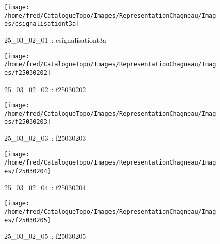 \documentclass[12pt,titlepage]{book}
\begin{document}
\begin{figure}[h!]
  \hfill         %
  \begin{minipage}[t]{3cm}
    \begin{center}
      \texttt{[image: /home/fred/CatalogueTopo/Images/RepresentationChagneau/Images/csignalisationt3a]}
      \caption[~25\_03\_02\_01]{\small{25\_03\_02\_01~:} \tiny{csignalisationt3a}}\label{csignalisationt3a}
    \end{center}
  \end{minipage}
  \begin{minipage}[t]{3cm}
    \begin{center}
      \texttt{[image: /home/fred/CatalogueTopo/Images/RepresentationChagneau/Images/f25030202]}
      \caption[~25\_03\_02\_02]{\small{25\_03\_02\_02~:} \tiny{f25030202}}\label{f25030202}
    \end{center}
  \end{minipage}
  \begin{minipage}[t]{3cm}
    \begin{center}
      \texttt{[image: /home/fred/CatalogueTopo/Images/RepresentationChagneau/Images/f25030203]}
      \caption[~25\_03\_02\_03]{\small{25\_03\_02\_03~:} \tiny{f25030203}}\label{f25030203}
    \end{center}
  \end{minipage}
  \begin{minipage}[t]{3cm}
    \begin{center}
      \texttt{[image: /home/fred/CatalogueTopo/Images/RepresentationChagneau/Images/f25030204]}
      \caption[~25\_03\_02\_04]{\small{25\_03\_02\_04~:} \tiny{f25030204}}\label{f25030204}
    \end{center}
  \end{minipage}
  \begin{minipage}[t]{3cm}
    \begin{center}
      \texttt{[image: /home/fred/CatalogueTopo/Images/RepresentationChagneau/Images/f25030205]}
      \caption[~25\_03\_02\_05]{\small{25\_03\_02\_05~:} \tiny{f25030205}}\label{f25030205}
    \end{center}
  \end{minipage}
\end{figure}
\end{document}
